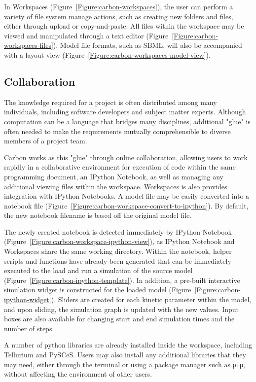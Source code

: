 In Workspaces (Figure~\ref{Figure:carbon-workspaces}), the user can perform a variety of file system manage actions, such as creating new folders and files, either through upload or copy-and-paste.
All files within the workspace may be viewed and manipulated through a text editor (Figure~\ref{Figure:carbon-workspaces-files}).
Model file formats, such as SBML, will also be accompanied with a layout view (Figure~\ref{Figure:carbon-workspaces-model-view}).

\subsection{Collaboration}
The knowledge required for a project is often distributed among many individuals, including software developers and subject matter experts. \autocite{ragan2013collaborative}
Although computation can be a language that bridges many disciplines, additional "glue" is often needed to make the requirements mutually comprehensible to diverse members of a project team.

Carbon works as this "glue" through online collaboration, allowing users to work rapidly in a collaborative environment for execution of code within the same programming document, an IPython Notebook, as well as managing any additional viewing files within the workspace.
Workspaces is also provides integration with IPython Notebooks.
A model file may be easily converted into a notebook file (Figure~\ref{Figure:carbon-workspace-convert-to-ipython}).
By default, the new notebook filename is based off the original model file.

The newly created notebook is detected immediately by IPython Notebook (Figure~\ref{Figure:carbon-workspace-ipython-view}), as IPython Notebook and Workspaces share the same working directory.
Within the notebook, helper scripts and functions have already been generated that can be immediately executed to the load and run a simulation of the source model (Figure~\ref{Figure:carbon-ipython-template}).
In addition, a pre-built interactive simulation widget is constructed for the loaded model (Figure~\ref{Figure:carbon-ipython-widget}).
Sliders are created for each kinetic parameter within the model, and upon sliding, the simulation graph is updated with the new values.
Input boxes are also available for changing start and end simulation times and the number of steps.

A number of python libraries are already installed inside the workspace, including Tellurium \autocite{tellurium2014tellurium} and PySCeS.
Users may also install any additional libraries that they may need, either through the terminal or using a package manager such as \texttt{pip}, without affecting the environment of other users.



